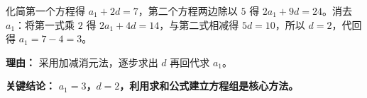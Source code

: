 \begin{examplebox}
\begin{description}[style=nextline, leftmargin=2.8em, labelsep=0.5em, itemsep=0.45em]
    \item[\textbf{第三步（解方程组）：}] 
    化简第一个方程得 $a_1 + 2d = 7$，第二个方程两边除以 $5$ 得 $2a_1 + 9d = 24$。消去 $a_1$：将第一式乘 $2$ 得 $2a_1+4d=14$，与第二式相减得 $5d=10$，所以 $d=2$，代回得 $a_1 = 7-4=3$。
    \par\textbf{理由：}
    采用加减消元法，逐步求出 $d$ 再回代求 $a_1$。
\end{description}

\textbf{\textcolor{CExample}{关键结论：}} \textbf{$a_1=3$，$d=2$，利用求和公式建立方程组是核心方法。}
\end{examplebox}
